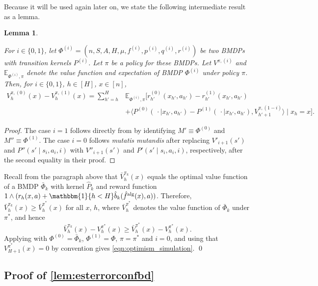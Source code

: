 \documentclass[11pt]{article}
\newcommand{\mbbE}{\mathbb{E}}
\newcommand{\alg}{\textnormal{alg}}
\newtheorem{lemma}[theorem]{Lemma}
\theoremstyle{definition}
\theoremstyle{definition}
\begin{document}
Because it will be used again later on, we state the following intermediate result as a lemma.
\begin{lemma}
	\label{lem:simulation_lemma}

	For $i\in\{0,1\}$, let $\Phi^{(i)}=(n,S,A,H,\mu, f^{(i)},p^{(i)},q^{(i)},r^{(i)})$ be two \glspl{BMDP} with transition kernels $P^{(i)}$.
	Let $\pi$ be a policy for these \glspl{BMDP}.
	Let $V^{\pi,(i)}$ and $\mbbE_{\Phi^{(i)},\pi}$ denote the value function and expectation of \gls{BMDP} $\Phi^{(i)}$ under policy $\pi$.
	Then, for $i\in \{0,1\}$, $h\in[H]$, $x\in[n]$,
	\begin{align}
		V_h^{\pi,(0)}(x)-V_h^{\pi,(1)}(x)
		=
		\sum_{h'=h}^{H}
		&
		\mbbE_{\Phi^{(i)},\pi}
		\bigl[
			r_{h'}^{(0)}(x_{h'},a_{h'})-r_{h'}^{(1)}(x_{h'},a_{h'})
			\\
			 &
			+
			\bigl\langle
			P^{(0)}(\,\cdot  \mid x_{h'},a_{h'})
			-
			P^{(1)}(\,\cdot  \mid x_{h'},a_{h'}), V_{h'+1}^{\pi,(1-i)}
			\bigr\rangle
			\mid
			x_h=x
		\bigr]
		.
		\nonumber
	\end{align}
\end{lemma}
\begin{proof}
	The case $i = 1$ follows directly from \cite[Lemma E.15]{dann2017unifying} by identifying $M'\equiv \Phi^{(0)}$ and $M'' \equiv \Phi^{(1)}$.
	The case $i = 0$ follows \emph{mutatis mutandis} after replacing $V'_{i+1}(s')$ and $P''(s'\mid s_i,a_i,i)$ with $V''_{i+1}(s')$ and $P'(s'\mid s_i,a_i,i)$, respectively, after the second equality in their proof.
\end{proof}
Recall from the paragraph above  that $\bar{V}^{\pi_k}_h(x)$ equals the optimal value function of a \gls{BMDP} $\bar{\Phi}_k$ with kernel $\hat{P}_k$ and reward function $1\wedge (r_h(x,a)+\mathbbm{1}\{h < H\}\hat{b}_k(\hat{f}^{\alg}(x),a))$.
Therefore, $\bar{V}^{\pi_k}_h(x)\geq \bar{V}^{\pi^*}_h(x)$ for all $x$, $h$, where $\bar{V}^{\pi^*}_h$ denotes the value function of $\bar{\Phi}_k$ under $\pi^*$, and hence
\begin{equation}
	\bar{V}^{\pi_k}_h(x)-V^{\pi^*}_h(x)
	\geq
	\bar{V}^{\pi^*}_h(x)-V^{\pi^*}_h(x)
	.
\end{equation}
Applying  with $\Phi^{(0)}=\bar{\Phi}_k$, $\Phi^{(1)}=\Phi$, $\pi=\pi^*$ and $i=0$, and using that $V^{\pi^*}_{H+1}(x) = 0$ by convention gives \eqref{eqn:optimism_simulation}.
\qed

\subsection{Proof of \texorpdfstring{\cref{lem:esterrorconfbd}}{confidence bound on next context value}}
\label{sec:proof_of_estimation_error_conf_bd}
\end{document}
